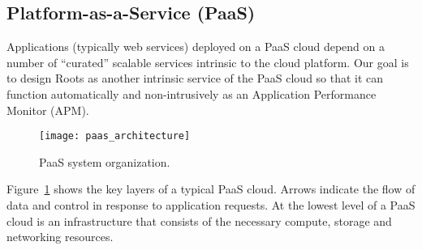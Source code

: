 \subsection{Platform-as-a-Service (PaaS)}

Applications (typically web services) deployed on
a PaaS cloud depend on a number of ``curated'' scalable services intrinsic to the 
cloud platform. Our goal is to design Roots as another intrinsic service of the PaaS cloud
so that it can function automatically and non-intrusively as an Application
Performance Monitor (APM).

\begin{figure}
\centering
\texttt{[image: paas\_architecture]}
\caption{PaaS system organization.}
\label{fig:paas_architecture}
\end{figure}

Figure~\ref{fig:paas_architecture} shows the key layers of a typical PaaS cloud. Arrows indicate
the flow of data and control in response to application requests.
At the lowest level of a PaaS cloud is an infrastructure that consists of the necessary compute, storage
and networking resources. 

